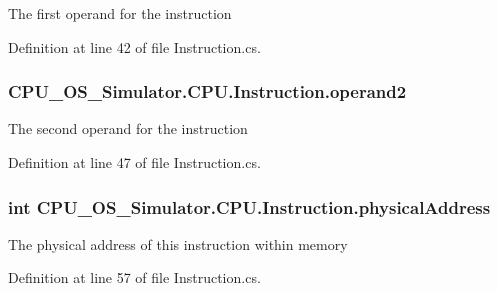 The first operand for the instruction 



Definition at line 42 of file Instruction.\+cs.

\hypertarget{class_c_p_u___o_s___simulator_1_1_c_p_u_1_1_instruction_a76e9ca211aca72f65c8ad9e11fbdad47}{}
\subsubsection[{operand2}]{ C\+P\+U\+\_\+\+O\+S\+\_\+\+Simulator.\+C\+P\+U.\+Instruction.\+operand2\hspace{0.3cm}{\ttfamily [private]}}\label{class_c_p_u___o_s___simulator_1_1_c_p_u_1_1_instruction_a76e9ca211aca72f65c8ad9e11fbdad47}


The second operand for the instruction 



Definition at line 47 of file Instruction.\+cs.

\hypertarget{class_c_p_u___o_s___simulator_1_1_c_p_u_1_1_instruction_a401c8f3740b63632e17db6f80b505a17}{}
\subsubsection[{physical\+Address}]{\setlength{\rightskip}{0pt plus 5cm}int C\+P\+U\+\_\+\+O\+S\+\_\+\+Simulator.\+C\+P\+U.\+Instruction.\+physical\+Address\hspace{0.3cm}{\ttfamily [private]}}\label{class_c_p_u___o_s___simulator_1_1_c_p_u_1_1_instruction_a401c8f3740b63632e17db6f80b505a17}


The physical address of this instruction within memory 



Definition at line 57 of file Instruction.\+cs.

